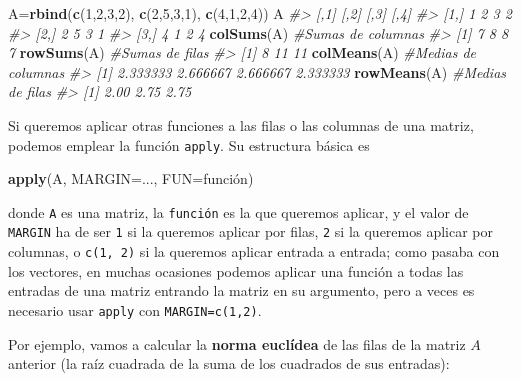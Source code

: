 \documentclass[
]{book}
\newenvironment{Shaded}{\begin{snugshade}}{\end{snugshade}}
\newcommand{\CommentTok}[1]{\textcolor[rgb]{0.56,0.35,0.01}{\textit{#1}}}
\newcommand{\DataTypeTok}[1]{\textcolor[rgb]{0.13,0.29,0.53}{#1}}
\newcommand{\DecValTok}[1]{\textcolor[rgb]{0.00,0.00,0.81}{#1}}
\newcommand{\KeywordTok}[1]{\textcolor[rgb]{0.13,0.29,0.53}{\textbf{#1}}}
\newcommand{\NormalTok}[1]{#1}
\theoremstyle{definition}
\theoremstyle{definition}
\theoremstyle{definition}
\theoremstyle{remark}
\begin{document}
\begin{Shaded}
\begin{Highlighting}[]
\NormalTok{A=}\KeywordTok{rbind}\NormalTok{(}\KeywordTok{c}\NormalTok{(}\DecValTok{1}\NormalTok{,}\DecValTok{2}\NormalTok{,}\DecValTok{3}\NormalTok{,}\DecValTok{2}\NormalTok{), }\KeywordTok{c}\NormalTok{(}\DecValTok{2}\NormalTok{,}\DecValTok{5}\NormalTok{,}\DecValTok{3}\NormalTok{,}\DecValTok{1}\NormalTok{), }\KeywordTok{c}\NormalTok{(}\DecValTok{4}\NormalTok{,}\DecValTok{1}\NormalTok{,}\DecValTok{2}\NormalTok{,}\DecValTok{4}\NormalTok{))}
\NormalTok{A}
\CommentTok{\#\textgreater{}      [,1] [,2] [,3] [,4]}
\CommentTok{\#\textgreater{} [1,]    1    2    3    2}
\CommentTok{\#\textgreater{} [2,]    2    5    3    1}
\CommentTok{\#\textgreater{} [3,]    4    1    2    4}
\KeywordTok{colSums}\NormalTok{(A)  }\CommentTok{\#Sumas de columnas}
\CommentTok{\#\textgreater{} [1] 7 8 8 7}
\KeywordTok{rowSums}\NormalTok{(A)  }\CommentTok{\#Sumas de filas}
\CommentTok{\#\textgreater{} [1]  8 11 11}
\KeywordTok{colMeans}\NormalTok{(A)  }\CommentTok{\#Medias de columnas}
\CommentTok{\#\textgreater{} [1] 2.333333 2.666667 2.666667 2.333333}
\KeywordTok{rowMeans}\NormalTok{(A)  }\CommentTok{\#Medias de filas}
\CommentTok{\#\textgreater{} [1] 2.00 2.75 2.75}
\end{Highlighting}
\end{Shaded}

Si queremos aplicar otras funciones a las filas o las columnas de una matriz, podemos emplear la función \texttt{apply}. Su estructura básica es

\begin{Shaded}
\begin{Highlighting}[]
\KeywordTok{apply}\NormalTok{(A, }\DataTypeTok{MARGIN=}\NormalTok{..., }\DataTypeTok{FUN=}\NormalTok{función)}
\end{Highlighting}
\end{Shaded}

donde \texttt{A} es una matriz, la \texttt{función} es la que queremos aplicar,
y el valor de \texttt{MARGIN} ha de ser \texttt{1} si la queremos aplicar por filas, \texttt{2} si la queremos aplicar por columnas, o \texttt{c(1,\ 2)} si la queremos aplicar entrada a entrada; como pasaba con los vectores, en muchas ocasiones podemos aplicar una función a todas las entradas de una matriz entrando la matriz en su argumento, pero a veces es necesario usar \texttt{apply} con \texttt{MARGIN=c(1,2)}.

Por ejemplo, vamos a calcular la \textbf{norma euclídea} de las filas de la matriz \(A\) anterior (la raíz cuadrada de la suma de los cuadrados de sus entradas):
\end{document}
